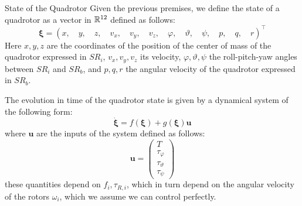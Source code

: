 \documentclass[10pt, a4paper]{report}
\begin{document}
\begin{boxdefinition}{State of the Quadrotor}{}
Given the previous premises, we define the state of a quadrotor as a vector in ${\mathbb R}^{12}$ defined as follows:\begin{equation}
    \boldsymbol{\xi}=(
        x,\quad y,\quad z,\quad v_x,\quad v_y,\quad v_z,\quad \varphi ,\quad  \vartheta ,\quad  \psi,\quad  p ,\quad q,\quad r
    )^\top
\end{equation}
Here $x,y,z$ are the coordinates of the position of the center of mass of the quadrotor expressed in $SR_i$, $v_x,v_y,v_z$ its velocity, $\varphi ,  \vartheta ,  \psi$ the roll-pitch-yaw angles between $SR_i$ and $SR_b$, and $p,q,r$ the angular velocity of the quadrotor expressed in $SR_b$.
\end{boxdefinition}
\noindent The evolution in time of the quadrotor state is given by a dynamical system of the following form:\begin{equation}\label{quadrotorSystem}
    \dot{\boldsymbol{\xi}}=f(\boldsymbol{\xi})+g(\boldsymbol{\xi})\mathbf u 
\end{equation}
where $\mathbf u$ are the inputs of the system defined as follows:\begin{equation}
    \mathbf{u}=\begin{pmatrix}T\\ \tau_\varphi \\  \tau_\vartheta \\  \tau_\psi
    \end{pmatrix}
\end{equation}
these quantities depend on $f_i,\tau_{R,i}$, which in turn depend on the angular velocity of the rotors $\omega_i$, which we assume we can control perfectly. 
\end{document}
